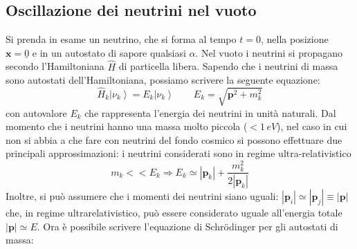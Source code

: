 \subsection{Oscillazione dei neutrini nel vuoto}
Si prenda in esame un neutrino, che si forma al tempo $t=0$, nella posizione $\mathbf{x}=\underline{0}$ e in un autostato di sapore qualsiasi $\alpha$. Nel vuoto i neutrini si propagano secondo l'Hamiltoniana $\hat{H}$ di particella libera. Sapendo che i neutrini di massa sono autostati dell'Hamiltoniana, possiamo scrivere la seguente equazione:
\begin{equation}
\hat{H}_k\left|\nu_k\right\rangle=E_k\left|\nu_k\right\rangle \qquad E_k=\sqrt{\mathbf{ p}^2+m_k^2}
\label{eq:auto}
\end{equation}
con autovalore $E_k$ che rappresenta l'energia dei neutrini in unità naturali. Dal momento che i neutrini hanno una massa molto piccola ($<1\,\unit{eV}$), nel caso in cui non si abbia a che fare con neutrini del fondo cosmico si possono effettuare due principali approssimazioni: i neutrini considerati sono in regime ultra-relativistico
\begin{equation}
    m_k<<E_k\Rightarrow E_k\simeq|\mathbf{p}_k|+\frac{m_k^2}{2|\mathbf{p}_k|}
    \label{eq:ultra}
\end{equation}
Inoltre, si può assumere che i momenti dei neutrini siano uguali: $|\mathbf{p}_i|\simeq |\mathbf{p}_j|\equiv |\mathbf{p}|$ che, in regime ultrarelativistico, può essere considerato uguale all'energia totale $|\mathbf{p}|\simeq E$.
Ora è possibile scrivere l'equazione di Schr\"odinger per gli autostati di massa:

